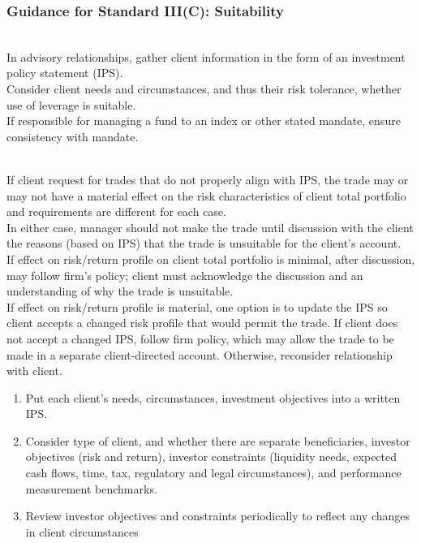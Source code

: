 \subsubsection{Guidance for Standard III(C): Suitability}

\begin{remark} \\
In advisory relationships, gather client information in the form of an investment policy statement (IPS).\\
Consider client needs and circumstances, and thus their risk tolerance, whether use of leverage is suitable.\\
If responsible for managing a fund to an index or other stated mandate, ensure consistency with mandate.
\end{remark}

\begin{remark} \\
If client request for trades that do not properly align with IPS, the trade may or may not have a material effect on the risk characteristics of client total portfolio and requirements are different for each case.\\
In either case, manager should not make the trade until discussion with the client the reasons (based on IPS) that the trade is unsuitable for the client's account.\\
If effect on risk/return profile on client total portfolio is minimal, after discussion, may follow firm's policy; client must acknowledge the discussion and an understanding of why the trade is unsuitable.\\
If effect on risk/return profile is material, one option is to update the IPS so client accepts a changed risk profile that would permit the trade. If client does not accept a changed IPS, follow firm policy, which may allow the trade to be made in a separate client-directed account. Otherwise, reconsider relationship with client.
\end{remark}

\begin{remark} 
\begin{enumerate}[label=\roman*.]
\setlength{\itemsep}{0pt}
\item Put each client's needs, circumstances, investment objectives into a written IPS.
\item Consider type of client, and whether there are separate beneficiaries, investor objectives (risk and return), investor constraints (liquidity needs, expected cash flows, time, tax, regulatory and legal circumstances), and performance measurement benchmarks.
\item Review investor objectives and constraints periodically to reflect any changes in client circumstances
\end{enumerate}
\end{remark}

